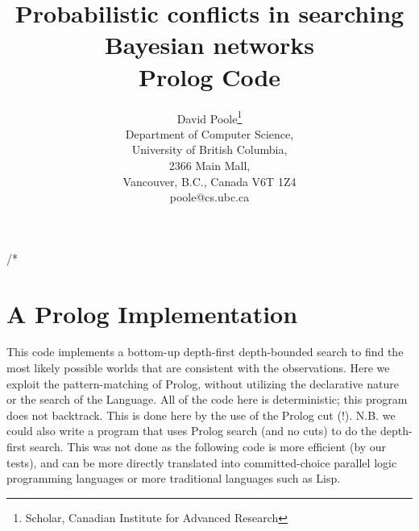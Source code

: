  /* 
\title{Probabilistic conflicts in searching  
Bayesian networks\\Prolog Code}
\author{David Poole\thanks{Scholar, Canadian Institute for Advanced Research}\\
Department of Computer Science,\\ 
University of British Columbia,\\
2366 Main Mall,\\
Vancouver, B.C., Canada V6T 1Z4\\ 
poole@cs.ubc.ca}

\maketitle
\appendix
\section{A Prolog Implementation} \label{code}

This code implements a bottom-up depth-first depth-bounded search to
find the most likely possible worlds that are consistent with the
observations. Here we exploit the pattern-matching of Prolog, without
utilizing the declarative nature or the search of the Language.  All
of the code here is deterministic; this program does not backtrack.
This is done here by the use of the Prolog cut (!). N.B. we could also
write a program that uses Prolog search (and no cuts) to do the
depth-first search. This was not done as the following code is more
efficient (by our tests), and can be more directly translated into
committed-choice parallel logic programming languages or more traditional
languages such as Lisp.

